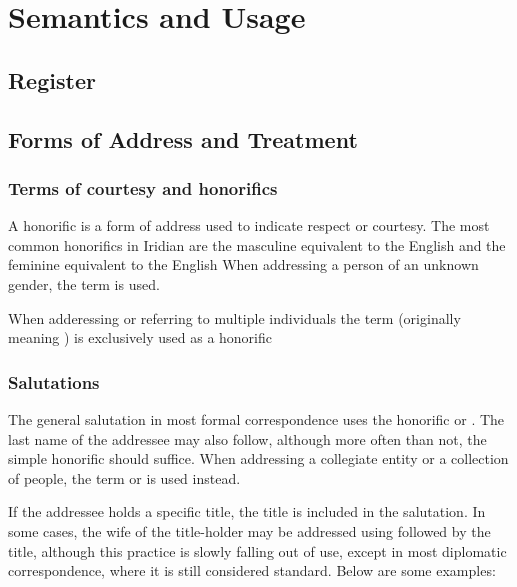 \chapter{Semantics and Usage}

\section{Register}
\section{Forms of Address and Treatment}

\subsection{Terms of courtesy and honorifics}

A {\sc honorific} is a form of address used to indicate respect or courtesy. The most common honorifics in Iridian are the masculine  equivalent to the English  and the feminine  equivalent to the English  When addressing a person of an unknown gender, the term  is used.

When adderessing or referring to multiple individuals the term  (originally meaning ) is exclusively used as a honorific

\subsection{Salutations}

The general salutation in most formal correspondence uses the honorific  or . The last name of the addressee may also follow, although more often than not, the simple honorific should suffice. When addressing a collegiate entity or a collection of people, the term  or  is used instead.

If the addressee holds a specific title, the title is included in the salutation. In some cases, the wife of the title-holder may be addressed using  followed by the title, although this practice is slowly falling out of use, except in most diplomatic correspondence, where it is still considered standard. Below are some examples:


